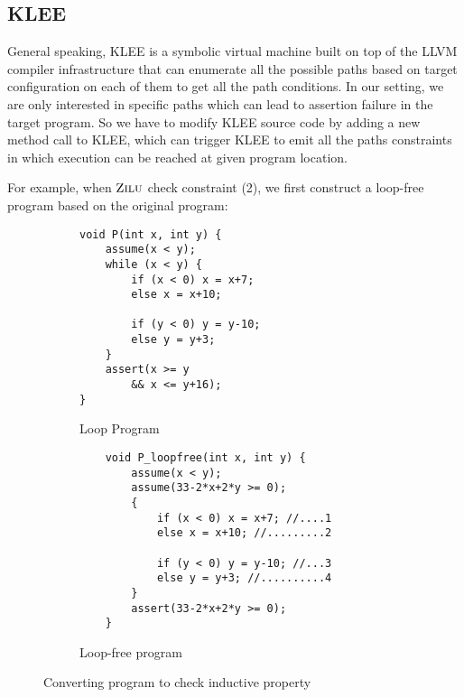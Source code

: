 \subsection{KLEE}
General speaking, KLEE\cite{cadar2008klee} is a symbolic virtual machine built on top of the LLVM compiler infrastructure
that can enumerate all the possible paths based on target configuration on each of them to get all the path conditions.
In our setting, we are only interested in specific paths which can lead to assertion failure in the target program.
So we have to modify KLEE source code by adding a new method call to KLEE,
which can trigger KLEE to emit all the paths constraints in which execution can be reached at given program location.

For example, when $\textsc{Zilu}$ check constraint (2), 
we first construct a loop-free program based on the original program:
\begin{figure}[!h]
\begin{subfigure}{0.20\textwidth}
    \centering
    {\scriptsize\begin{verbatim}
void P(int x, int y) {
    assume(x < y);
    while (x < y) {
        if (x < 0) x = x+7;
        else x = x+10;
    
        if (y < 0) y = y-10;
        else y = y+3; 
    }
    assert(x >= y
        && x <= y+16);
}
    \end{verbatim}}
    \vspace{-5mm}
    \caption{Loop Program}
    \label{fig:running:example:program}
\end{subfigure}%
\begin{subfigure}{.20\textwidth}
      \centering
      \vspace{-0.1cm}
        {\scriptsize\begin{verbatim}
    void P_loopfree(int x, int y) {
        assume(x < y);
        assume(33-2*x+2*y >= 0);
        {
            if (x < 0) x = x+7; //....1
            else x = x+10; //.........2
    
            if (y < 0) y = y-10; //...3
            else y = y+3; //..........4
        }
        assert(33-2*x+2*y >= 0);
    }
    \end{verbatim}}
    \vspace{-5mm}
    \caption{Loop-free program}
      \label{fig:running:example:verification}
\end{subfigure}
\caption{Converting program to check inductive property}
\label{fig:running:example}
\end{figure}

